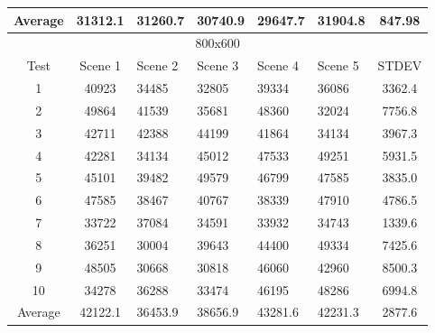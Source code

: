 \begin{table}[H]
\begin{tabular}{| c | c | l | l | l | l | c | }
Average	&31312.1	&31260.7	&30740.9	&29647.7	&31904.8	&847.98\\
\hline
 \hline 
\multicolumn{7}{|c|}{800x600}\\
\hline
Test	&Scene 1	&Scene 2	&Scene 3	&Scene 4	&Scene 5	&STDEV\\\hline
1	&40923	&34485	&32805	&39334	&36086	&3362.4\\
2	&49864	&41539	&35681	&48360	&32024	&7756.8\\
3	&42711	&42388	&44199	&41864	&34134	&3967.3\\
4	&42281	&34134	&45012	&47533	&49251	&5931.5\\
5	&45101	&39482	&49579	&46799	&47585	&3835.0\\
6	&47585	&38467	&40767	&38339	&47910	&4786.5\\
7	&33722	&37084	&34591	&33932	&34743	&1339.6\\
8	&36251	&30004	&39643	&44400	&49334	&7425.6\\
9	&48505	&30668	&30818	&46060	&42960	&8500.3\\
10	&34278	&36288	&33474	&46195	&48286	&6994.8\\\hline
Average	&42122.1	&36453.9	&38656.9	&43281.6	&42231.3	&2877.6\\
\hline
\end{tabular}
\end{table}

\pagebreak

